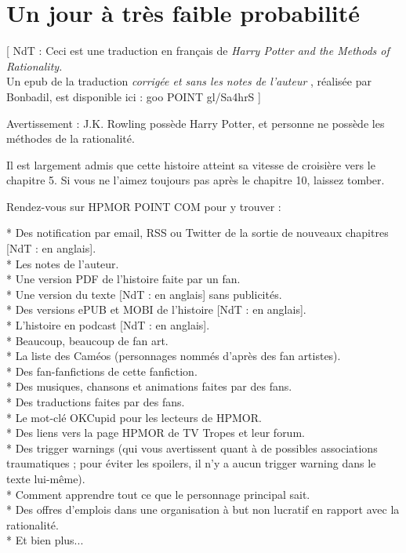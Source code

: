 
\chapter{Un jour à très faible probabilité}

[ NdT : Ceci est une traduction en français de \emph{Harry Potter and the Methods of Rationality.} \\\emph{} Un epub de la traduction \emph{corrigée et sans les notes de l'auteur} , réalisée par Bonbadil, est disponible ici : goo POINT gl/Sa4hrS ]

Avertissement : J.K. Rowling possède Harry Potter, et personne ne possède les méthodes de la rationalité.

Il est largement admis que cette histoire atteint sa vitesse de croisière vers le chapitre 5. Si vous ne l'aimez toujours pas après le chapitre 10, laissez tomber.

Rendez-vous sur HPMOR POINT COM pour y trouver :

* Des notification par email, RSS ou Twitter de la sortie de nouveaux chapitres [NdT : en anglais].\\* Les notes de l'auteur.\\* Une version PDF de l'histoire faite par un fan.\\* Une version du texte [NdT : en anglais] sans publicités.\\* Des versions ePUB et MOBI de l'histoire [NdT : en anglais].\\* L'histoire en podcast [NdT : en anglais].\\* Beaucoup, beaucoup de fan art.\\* La liste des Caméos (personnages nommés d'après des fan artistes).\\* Des fan-fanfictions de cette fanfiction.\\* Des musiques, chansons et animations faites par des fans.\\* Des traductions faites par des fans.\\* Le mot-clé OKCupid pour les lecteurs de HPMOR.\\* Des liens vers la page HPMOR de TV Tropes et leur forum.\\* Des trigger warnings (qui vous avertissent quant à de possibles associations traumatiques ; pour éviter les spoilers, il n'y a aucun trigger warning dans le texte lui-même).\\* Comment apprendre tout ce que le personnage principal sait.\\* Des offres d'emplois dans une organisation à but non lucratif en rapport avec la rationalité.\\* Et bien plus...

